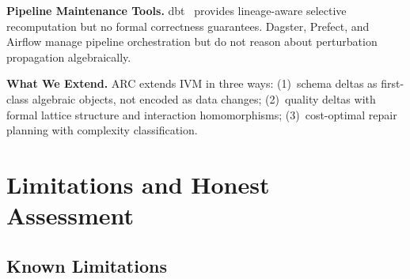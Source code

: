 \documentclass[11pt,a4paper]{article}
\theoremstyle{definition}
\begin{document}
\textbf{Pipeline Maintenance Tools.}
dbt~\cite{dbt2023} provides lineage-aware selective recomputation but no
formal correctness guarantees.  Dagster, Prefect, and Airflow manage pipeline
orchestration but do not reason about perturbation propagation algebraically.

\textbf{What We Extend.}
ARC extends IVM in three ways:
(1)~schema deltas as first-class algebraic objects, not encoded as data changes;
(2)~quality deltas with formal lattice structure and interaction homomorphisms;
(3)~cost-optimal repair planning with complexity classification.

\section{Limitations and Honest Assessment}
\label{sec:limitations}

\subsection{Known Limitations}
\end{document}

